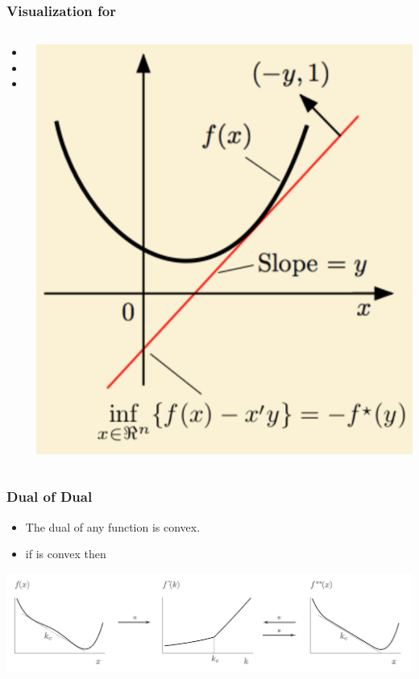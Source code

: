 \documentclass{beamer}
\begin{document}
\begin{frame}
  \frametitle{Visualization for \R{$\real$}}
  \begin{columns}
    \begin{column}{0.55\textwidth}
        \begin{itemize}
            \item {}
            \item {}
            \item {}
        \end{itemize}
    \end{column}
    \begin{column}{0.43\textwidth}
          \includegraphics[width=\textwidth]{figures/Legendre-Duality.png}
    \end{column}
\end{columns}
\end{frame}

\begin{frame}
  \frametitle{Dual of Dual}
  \begin{itemize}
  \item The dual of any function is convex.
  \item if  is convex then 
  \end{itemize}
  \includegraphics[width=\textwidth]{figures/FromNonConvexToConvex.png}  
\end{frame}
\end{document}
